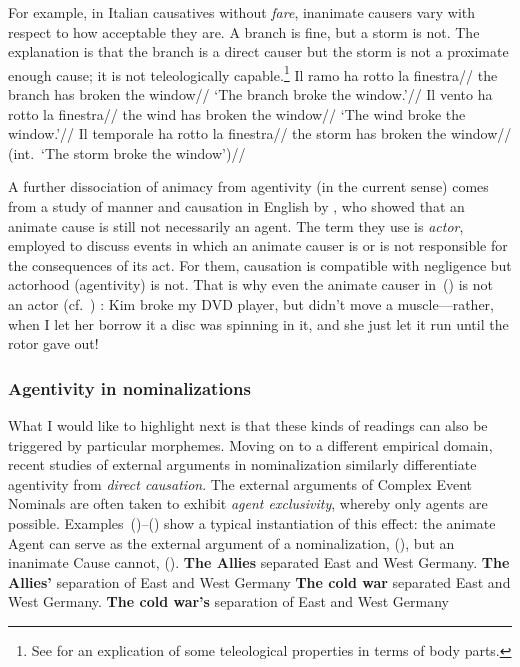 {For example, in Italian causatives without \emph{fare}, inanimate causers vary with respect to how acceptable they are. A branch is fine, but a storm is not. The explanation is that the branch is a direct causer but the storm is not a proximate enough cause; it is not teleologically capable.\footnote{See \cite{irwin19tlr} for an explication of some teleological properties in terms of body parts.}
\pex
	\a \begingl
		\gla Il ramo ha rotto la finestra//
		\glb the branch has broken the window//
		\glft `The branch broke the window.'//
		\endgl
	\a \begingl
		\gla {}Il vento ha rotto la finestra//
		\glb the wind has broken the window//
		\glft `The wind broke the window.'//
		\endgl
	\a \begingl
		\gla \ljudge{\#}Il temporale ha rotto la finestra//
		\glb the storm has broken the window//
		\glft (int.~`The storm broke the window')//
		\endgl
\xe		

A further dissociation of animacy from agentivity (in the current sense) comes from a study of manner and causation in English by \cite{beaverskoontzgarboden12}, who showed that an animate cause is still not necessarily an agent. The term they use is \emph{actor}, employed to discuss events in which an animate causer is or is not responsible for the consequences of its act. For them, causation is compatible with negligence but actorhood (agentivity) is not. That is why even the animate causer in~(\nextx) is not an actor (cf.~\citealt{rappaporthovav14}) :
\ex Kim broke my DVD player, but didn’t move a muscle—rather, when I let her borrow it a disc was spinning in it, and she just let it run until the rotor gave out!
\xe

		\subsubsection{Agentivity in nominalizations}
What I would like to highlight next is that these kinds of readings can also be triggered by particular morphemes. Moving on to a different empirical domain, recent studies of external arguments in nominalization \citep{sichel10n,alexiadouetal13,ahdout18nom} similarly differentiate agentivity from \emph{direct causation}. The external arguments of Complex Event Nominals are often taken to exhibit \emph{agent exclusivity}, whereby only agents are possible. Examples~(\nextx)--(\anextx) show a typical instantiation of this effect: the animate Agent can serve as the external argument of a nominalization, (\nextx), but an inanimate Cause cannot, (\anextx).
\pex
	\a \textbf{The Allies} separated East and West Germany.
	\a \textbf{The Allies'} separation of East and West Germany
\xe
\pex
	\a \textbf{The cold war} separated East and West Germany.
	\a \ljudge{\#}\textbf{The cold war's} separation of East and West Germany
\xe

}
